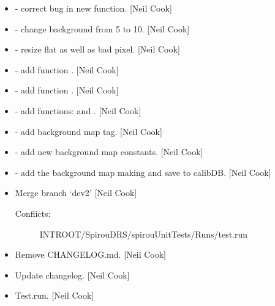 \documentclass[a4paper,10pt,english]{report}
\begin{document}
\begin{itemize}
\item {} 
 - correct bug in new function. {[}Neil Cook{]}

\item {} 
 - change background from 5 to 10. {[}Neil Cook{]}

\item {} 
 - resize flat as well as bad pixel. {[}Neil Cook{]}

\item {} 
 - add function . {[}Neil Cook{]}

\item {} 
 - add function . {[}Neil Cook{]}

\item {} 
 - add functions:  and
. {[}Neil Cook{]}

\item {} 
 - add background map tag. {[}Neil Cook{]}

\item {} 
 - add new background map constants. {[}Neil
Cook{]}

\item {} 
 - add the background map making and save to
calibDB. {[}Neil Cook{]}

\item {} 
Merge branch ‘dev2’ {[}Neil Cook{]}
\begin{description}
\item[{Conflicts:}] \leavevmode
INTROOT/SpirouDRS/spirouUnitTests/Runs/test.run

\end{description}

\item {} 
Remove CHANGELOG.md. {[}Neil Cook{]}

\item {} 
Update changelog. {[}Neil Cook{]}

\item {} 
Test.run. {[}Neil Cook{]}

\end{itemize}
\end{document}
